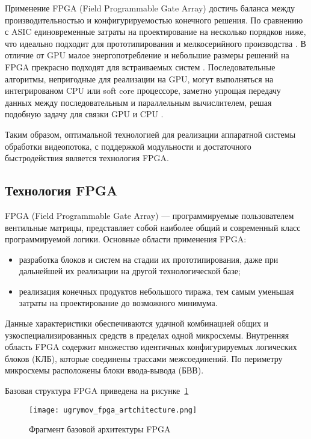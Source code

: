 Применение FPGA (Field Programmable Gate Array) достичь баланса между производительностью и конфигурируемостью конечного решения.
По сравнению с ASIC единовременные затраты на проектирование на несколько порядков ниже,
что идеально подходит для прототипирования и мелкосерийного производства \cite{zuchowski_asic_vs_fpga_cost}.
В отличие от GPU малое энергопотребление и небольшие размеры решений на FPGA прекрасно подходят
для встраиваемых систем \cite{berten_gpu_fpga_comparison}.
Последовательные алгоритмы, непригодные для реализации на GPU, могут выполняться
на интегрированом CPU или soft core процессоре, заметно упрощая передачу данных
между последовательным и параллельным вычислителем, решая подобную задачу
для связки GPU и CPU \cite{russo_softcore_fpga_vs_gpu}.

Таким образом, оптимальной технологией для реализации аппаратной системы обработки видеопотока,
с поддержкой модульности и достаточного быстродействия является технология FPGA.


\subsection{Технология FPGA}
\label{sub:domain:fpga}

FPGA (Field Programmable Gate Array) --- программируемые пользователем вентильные матрицы,
представляет собой наиболее общий и современный класс программируемой логики.
Основные области применения FPGA:
\begin{itemize}
  \item разработка блоков и систем на стадии их прототипирования, даже при дальнейшей их реализации на другой технологической базе;
  \item реализация конечных продуктов небольшого тиража, тем самым уменьшая затраты на проектирование до возможного минимума.
\end{itemize}

Данные характеристики обеспечиваются удачной комбинацией общих и узкоспециализированных средств
в пределах одной микросхемы. Внутренняя область FPGA содержит множество идентичных конфигурируемых логических блоков (КЛБ),
которые соединены трассами межсоединений. По периметру микросхемы расположены блоки ввода-вывода (БВВ).

Базовая структура FPGA приведена на рисунке~\ref{fig:domain:fpga:fpga_architecture}

\begin{figure}[ht]
  \centering
  \texttt{[image: ugrymov\_fpga\_artchitecture.png]}
  \caption{ Фрагмент базовой архитектуры FPGA \cite{ugrymov_digital_circuit_engineering} }
  \label{fig:domain:fpga:fpga_architecture}
\end{figure}

